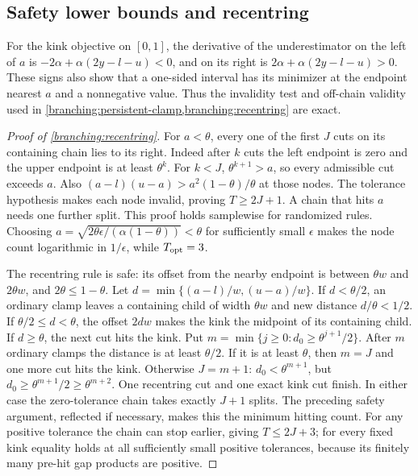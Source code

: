 \subsection{Safety lower bounds and recentring}
\label{app:branching-safety}

For the kink objective on $[0,1]$, the derivative of the underestimator
on the left of $a$ is $-2\alpha+\alpha(2y-l-u)<0$, and on its right
is $2\alpha+\alpha(2y-l-u)>0$. These signs also show that a one-sided
interval has its minimizer at the endpoint nearest $a$ and a
nonnegative value. Thus the invalidity test and off-chain validity used
in \cref{branching:persistent-clamp,branching:recentring} are exact.

\begin{proof}[Proof of \cref{branching:recentring}]
For $a<\theta$, every one of the first $J$ cuts on its containing
chain lies to its right. Indeed after $k$ cuts the left endpoint is zero
and the upper endpoint is at least $\theta^k$. For $k<J$,
$\theta^{k+1}>a$, so every admissible cut exceeds $a$. Also
$(a-l)(u-a)>a^2(1-\theta)/\theta$ at those nodes. The tolerance
hypothesis makes each node invalid, proving $T\ge2J+1$. A chain
that hits $a$ needs one further split. This proof holds samplewise for
randomized rules.
Choosing
$a=\sqrt{2\theta\epsilon/(\alpha(1-\theta))}<\theta$
for sufficiently small $\epsilon$ makes the node count logarithmic in
$1/\epsilon$, while $T_{\rm opt}=3$.

The recentring rule is safe: its offset from the nearby endpoint is
between $\theta w$ and $2\theta w$, and
$2\theta\le1-\theta$. Let
$d=\min\{(a-l)/w,(u-a)/w\}$. If $d<\theta/2$, an ordinary clamp
leaves a containing child of width $\theta w$ and new distance
$d/\theta<1/2$. If $\theta/2\le d<\theta$, the offset $2dw$
makes the kink the midpoint of its containing child. If $d\ge\theta$,
the next cut hits the kink.
Put $m=\min\{j\ge0:d_0\ge\theta^{j+1}/2\}$.
After $m$ ordinary clamps the distance is at least $\theta/2$.
If it is at least $\theta$, then $m=J$ and one more cut hits the kink.
Otherwise $J=m+1$: $d_0<\theta^{m+1}$, but
$d_0\ge\theta^{m+1}/2\ge\theta^{m+2}$. One recentring cut and one
exact kink cut finish. In either case the zero-tolerance chain takes
exactly $J+1$ splits. The preceding safety argument, reflected if
necessary, makes this the minimum hitting count. For any positive
tolerance the chain can stop earlier, giving $T\le2J+3$; for every
fixed kink equality holds at all sufficiently small positive tolerances,
because its finitely many pre-hit gap products are positive.
\end{proof}

